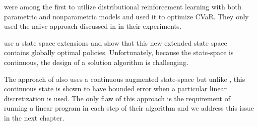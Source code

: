 \citet{morimura2010nonparametric, morimura2012parametric} were among the first to utilize distributional reinforcement learning with both parametric and nonparametric models and used it to optimize CVaR. They only used the naive approach discussed in  in their experiments.

\citet{bauerle2011markov} use a state space extensions and show that this new extended state space contains globally optimal policies. Unfortunately, because the state-space is continuous, the design of a solution algorithm is challenging.

The approach of \citet{chow2015risk} also uses a continuous augmented state-space but unlike \citet{bauerle2011markov}, this continuous state is shown to have bounded error when a particular linear discretization is used. The only flaw of this approach is the requirement of running a linear program in each step of their algorithm and we address this issue in the next chapter.



